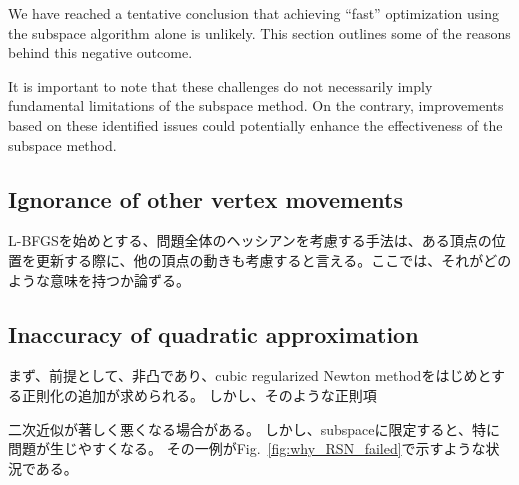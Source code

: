 \documentclass[dvipdfmx,journal]{IEEEtran}
\begin{document}
We have reached a tentative conclusion that achieving ``fast'' optimization using the subspace algorithm alone is unlikely.
This section outlines some of the reasons behind this negative outcome.

It is important to note that these challenges do not necessarily imply fundamental limitations of the subspace method. On the contrary, improvements based on these identified issues could potentially enhance the effectiveness of the subspace method.

\subsection{Ignorance of other vertex movements}\label{ssec:ignorance}

L-BFGSを始めとする、問題全体のヘッシアンを考慮する手法は、ある頂点の位置を更新する際に、他の頂点の動きも考慮すると言える。ここでは、それがどのような意味を持つか論ずる。

\subsection{Inaccuracy of quadratic approximation}\label{ssec:inaccuracy}

まず、前提として、非凸であり、cubic regularized Newton methodをはじめとする正則化の追加が求められる。
しかし、そのような正則項

二次近似が著しく悪くなる場合がある。
しかし、subspaceに限定すると、特に問題が生じやすくなる。
その一例がFig.~\ref{fig:why_RSN_failed}で示すような状況である。
\end{document}
